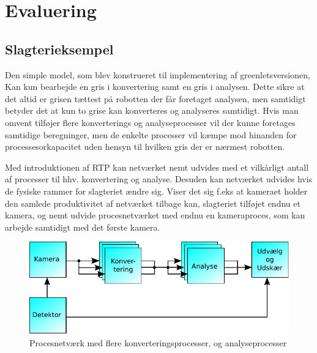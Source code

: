 \section{Evaluering}

\subsection{Slagterieksempel}
Den simple model, som blev konstrueret til implementering af greenletsversionen, Kan kun bearbejde en gris i konvertering samt en gris i analysen. Dette sikre at det altid er grisen tættest på robotten der får foretaget analysen, men samtidigt betyder det at kun to grise kan konverteres og analyseres samtidigt. Hvis man omvent tilføjer flere konverterings og analyseprocesser vil der kunne foretages samtidige beregninger, men de enkelte processer vil kæmpe mod hinanden for processesorkapacitet uden hensyn til hvilken gris der er nærmest robotten.

Med introduktionen af RTP kan netværket nemt udvides med et vilkårligt antall af processer til hhv. konvertering og analyse. Desuden kan netværket udvides hvis de fysiske rammer for slagteriet ændre sig. Viser det sig f.eks at kameraet holder den samlede produktivitet af netværket tilbage kan, slagteriet tilføjet endnu et kamera, og nemt udvide procesnetværket med endnu en kameraproces, som kan arbejde samtidigt med det første kamera. 


\begin{figure}
 \begin{center}
  \includegraphics[scale=1]{images/pig-network3}
	\caption{Procesnetværk med flere konverteringsprocesser, og analyseprocesser}
	\label{fig:pig-network3}
\end{center}
\end{figure}
